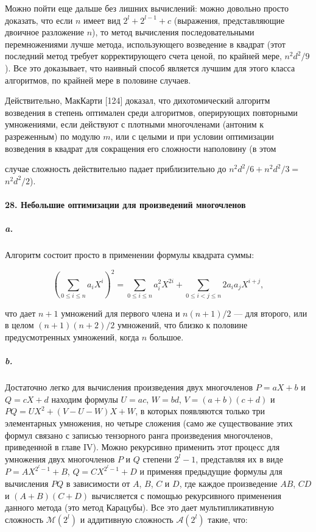\documentclass{../../template/mai_book}
\begin{document}
Можно пойти еще дальше без лишних вычислений: можно довольно просто доказать, что если $n$ имеет вид $2^l + 2^{l - 1} + c$ (выражения, представляющие двоичное разложение $n$), то метод вычисления последовательными перемножениями лучше метода, использующего возведение в квадрат (этот последний метод требует корректирующего счета ценой, по крайней мере, $n^2 d^2 / 9$). Все это доказывает, что наивный способ является лучшим для этого класса алгоритмов, по крайней мере в половине случаев. \newline

Действительно, МакКарти [124] доказал, что дихотомический алгоритм возведения в степень оптимален среди алгоритмов, оперирующих повторными умножениями, если действуют с плотными многочленами (антоним к разреженным) по модулю $m$, или с целыми и при условии оптимизации возведения в квадрат для сокращения его сложности наполовину (в этом

\newpage


\noindent
случае сложность действительно падает приблизительно до $n^2 d^2 / 6 + n^2 d^2 / 3 =$ \linebreak $n^2 d^2 / 2$).

\paragraph{28. Небольшие оптимизации для произведений многочленов}

\subparagraph{a.} Алгоритм состоит просто в применении формулы квадрата
суммы:

\begin{equation*}
\left( \sum_{0 \leqslant i \leqslant n} a_i X^i \right)^2 = \sum_{0 \leqslant i \leqslant n} a_i^2 X^{2i} + \sum_{0 \leqslant i < j \leqslant n} 2a_i a_j X^{i + j},
\end{equation*}

\noindent
что дает $n + 1$ умножений для первого члена и $n(n + 1)/2$ — для  второго, или в целом $(n + 1)(n + 2)/2$ умножений, что близко к половине предусмотренных умножений, когда $n$ большое.

\subparagraph{b.} Достаточно легко для вычисления произведения двух многочленов $P = aX + b$ и $Q = cX + d$ находим формулы $U = ac$, $W = bd$, $V = (a + b)(c + d)$ и $PQ = UX^2 + (V - U - W)X + W$, в которых появляются только три элементарных умножения, но четыре сложения (само же существование этих формул связано с записью тензорного ранга произведения многочленов, приведенной в главе IV). Можно рекурсивно применить этот процесс для умножения двух многочленов $P$ и $Q$ степени $2^l - 1$, представляя их в виде $P = AX^{2^l - 1} + B$, $Q = CX^{2^l - 1} + D$ и применяя предыдущие формулы для вычисления $PQ$ в зависимости от $A$, $B$, $C$ и $D$, где каждое произведение $AB$, $CD$ и $(A + B)(C + D)$ вычисляется с помощью рекурсивного применения данного метода (это метод Карацубы). Все это дает мультипликативную сложность $\mathcal{M}(2^l)$ и аддитивную сложность $\mathcal{A}(2^l)$ такие, что:
\end{document}
